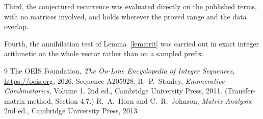 \documentclass[11pt,a4paper]{article}
\theoremstyle{plain}
\theoremstyle{definition}
\begin{document}
Third, the conjectured recurrence was evaluated directly on the published terms, with no
matrices involved, and holds wherever the proved range and the data overlap.

Fourth, the annihilation test of Lemma~\ref{lem:crit} was carried out in exact integer
arithmetic on the whole vector rather than on a sampled prefix.

\begin{thebibliography}{9}
 The OEIS Foundation, \emph{The On-Line Encyclopedia of Integer
Sequences}, \url{https://oeis.org}, 2026. Sequence A205928.
 R.~P.~Stanley, \emph{Enumerative Combinatorics}, Volume 1, 2nd ed.,
Cambridge University Press, 2011. (Transfer-matrix method, Section 4.7.)
 R.~A.~Horn and C.~R.~Johnson, \emph{Matrix Analysis}, 2nd ed., Cambridge
University Press, 2013.
\end{thebibliography}
\end{document}
